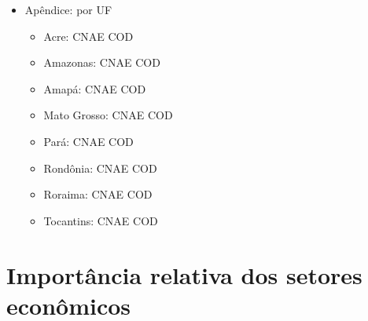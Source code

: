 \documentclass[8pt]{beamer}
\begin{document}
\begin{frame}[label=indice_principal]{}
\begin{itemize}
\vspace{1mm}

\item{Apêndice: por UF
	\begin{itemize}
	\item{Acre: CNAE	\hyperlink{amzaccnae2dig}{} COD 	\hyperlink{amzaccod2dig}{}}
	\item{Amazonas: CNAE	\hyperlink{amzamcnae2dig}{} COD 	\hyperlink{amzamcod2dig}{}}
	\item{Amapá: CNAE	\hyperlink{amzapcnae2dig}{} COD 	\hyperlink{amzapcod2dig}{}}
	\item{Mato Grosso: CNAE	\hyperlink{amzmtcnae2dig}{} COD 	\hyperlink{amzmtcod2dig}{}}
	\item{Pará: CNAE	\hyperlink{amzpacnae2dig}{} COD 	\hyperlink{amzpacod2dig}{}}
	\item{Rondônia: CNAE	\hyperlink{amzrocnae2dig}{} COD 	\hyperlink{amzrocod2dig}{}}
	\item{Roraima: CNAE	\hyperlink{amzrrcnae2dig}{} COD 	\hyperlink{amzrrcod2dig}{}}
	\item{Tocantins: CNAE	\hyperlink{amztocnae2dig}{} COD 	\hyperlink{amztocod2dig}{}}
	\vspace{1mm}
	\end{itemize}
}

\end{itemize}

\end{frame}

\section{Importância relativa dos setores econômicos}
\end{document}

